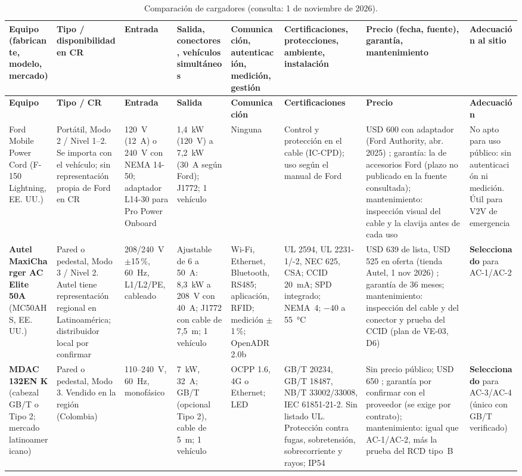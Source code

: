 \begin{landscape}
\thispagestyle{lscape}
{\scriptsize
\begin{longtable}{L{2.6cm}L{2.0cm}L{2.6cm}L{2.8cm}L{3.3cm}L{3.6cm}L{3.0cm}L{2.6cm}}
\caption{Comparación de cargadores (consulta: 1 de noviembre de 2026).}\label{tab:cargadores}\\
\toprule
\textbf{Equipo (fabricante, modelo, mercado)} & \textbf{Tipo / disponibilidad en CR} & \textbf{Entrada} & \textbf{Salida, conectores, vehículos simultáneos} & \textbf{Comunicación, autenticación, medición, gestión} & \textbf{Certificaciones, protecciones, ambiente, instalación} & \textbf{Precio (fecha, fuente), garantía, mantenimiento} & \textbf{Adecuación al sitio}\\
\midrule\endfirsthead
\toprule
\textbf{Equipo} & \textbf{Tipo / CR} & \textbf{Entrada} & \textbf{Salida} & \textbf{Comunicación} & \textbf{Certificaciones} & \textbf{Precio} & \textbf{Adecuación}\\
\midrule\endhead
Ford Mobile Power Cord (F-150 Lightning, EE. UU.) & Portátil, Modo 2 / Nivel 1--2. Se importa con el vehículo; sin representación propia de Ford en CR & 120~V (12~A) o 240~V con NEMA 14-50; adaptador L14-30 para Pro Power Onboard & 1,4~kW (120~V) a 7,2~kW (30~A según Ford); J1772; 1 vehículo & Ninguna & Control y protección en el cable (IC-CPD); uso según el manual de Ford & USD 600 con adaptador (Ford Authority, abr. 2025) \cite{fordAuthority}; garantía: la de accesorios Ford (plazo no publicado en la fuente consultada); mantenimiento: inspección visual del cable y la clavija antes de cada uso & No apto para uso público: sin autenticación ni medición. Útil para V2V de emergencia\\
\textbf{Autel MaxiCharger AC Elite 50A} (MC50AHS, EE. UU.) & Pared o pedestal, Modo 3 / Nivel 2. Autel tiene representación regional en Latinoamérica; distribuidor local por confirmar \supuesto{} & 208/240~V $\pm$15\,\%, 60~Hz, L1/L2/PE, cableado & Ajustable de 6 a 50~A: 8,3~kW a 208~V con 40~A; J1772 con cable de 7,5~m; 1 vehículo & Wi-Fi, Ethernet, Bluetooth, RS485; aplicación, RFID; medición $\pm$1\,\%; OpenADR 2.0b & UL 2594, UL 2231-1/-2, NEC 625, CSA; CCID 20~mA; SPD integrado; NEMA~4; $-40$ a 55~°C & USD 639 de lista, USD 525 en oferta (tienda Autel, 1 nov 2026) \cite{autelStore}; garantía de 36 meses; mantenimiento: inspección del cable y del conector y prueba del CCID (plan de VE-03, D6) & \textbf{Seleccionado} para AC-1/AC-2\\
\textbf{MDAC 132EN K} (cabezal GB/T o Tipo 2; mercado latinoamericano) & Pared o pedestal, Modo 3. Vendido en la región (Colombia) \cite{mdac} & 110--240~V, 60~Hz, monofásico & 7~kW, 32~A; GB/T (opcional Tipo 2), cable de 5~m; 1 vehículo & OCPP 1.6, 4G o Ethernet; LED & GB/T 20234, GB/T 18487, NB/T 33002/33008, IEC 61851-21-2. Sin listado UL. Protección contra fugas, sobretensión, sobrecorriente y rayos; IP54 & Sin precio público; USD 650 \supuesto{}; garantía por confirmar con el proveedor (se exige por contrato); mantenimiento: igual que AC-1/AC-2, más la prueba del RCD tipo~B & \textbf{Seleccionado} para AC-3/AC-4 (único con GB/T verificado)\\

\end{longtable}}
\end{landscape}

